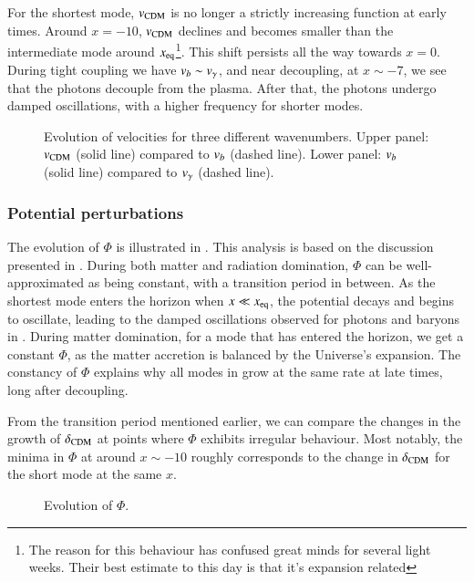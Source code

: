 For the shortest mode, $v_\mathrm{CDM}$ is no longer a strictly increasing function at early times. Around $x=-10$, $v_\mathrm{CDM}$ declines and becomes smaller than the intermediate mode around $x_\mathrm{eq}$\footnote{The reason for this behaviour has confused great minds for several light weeks. Their best estimate to this day is that it's expansion related}. This shift persists all the way towards $x=0$. During tight coupling we have $v_b\sim v_\gamma$, and near decoupling, at $x\sim-7$, we see that the photons decouple from the plasma. After that, the photons undergo damped oscillations, with a higher frequency for shorter modes. 

\begin{figure}[ht!]
    \caption{Evolution of velocities for three different wavenumbers. Upper panel: $v_\mathrm{CDM}$ (solid line) compared to $v_b$ (dashed line). Lower panel: $v_b$ (solid line) compared to $v_\gamma$ (dashed line).}
    \label{fig:M3:results:vels}
\end{figure}


\subsubsection{Potential perturbations} \label{sssec:M3:results:potential_perturbations}
The evolution of $\Phi$ is illustrated in . This analysis is based on the discussion presented in \cite[Ch. 8]{Dodelson}. During both matter and radiation domination, $\Phi$ can be well-approximated as being constant, with a transition period in between. As the shortest mode enters the horizon when $x\ll x_\mathrm{eq}$, the potential decays and begins to oscillate, leading to the damped oscillations observed for photons and baryons in . During matter domination, for a mode that has entered the horizon, we get a constant $\Phi$, as the matter accretion is balanced by the Universe's expansion. The constancy of $\Phi$ explains why all modes in  grow at the same rate at late times, long after decoupling. 

From the transition period mentioned earlier, we can compare the changes in the growth of $\delta_\mathrm{CDM}$ at points where $\Phi$ exhibits irregular behaviour. Most notably, the minima in $\Phi$ at around $x\sim-10$ roughly corresponds to the change in $\delta_\mathrm{CDM}$ for the short mode at the same $x$.

\begin{figure}[ht!]
    \caption{Evolution of $\Phi$.}
    \label{fig:M3:results:Phi}
\end{figure}

